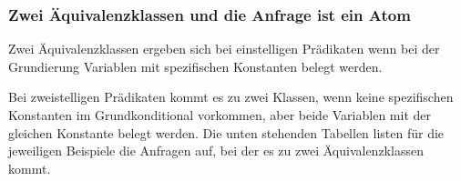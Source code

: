 \documentclass[a4paper, 11pt]{book}
\begin{document}
\subsubsection {Zwei Äquivalenzklassen und die Anfrage ist ein Atom} \label{Atom_zweiKlassen}

	Zwei Äquivalenzklassen ergeben sich bei einstelligen Prädikaten wenn bei der Grundierung Variablen mit spezifischen Konstanten belegt werden. 
	
	Bei zweistelligen Prädikaten kommt es zu zwei Klassen, wenn keine spezifischen Konstanten im Grundkonditional vorkommen, aber beide Variablen mit der gleichen Konstante belegt werden.
	Die unten stehenden Tabellen listen für die jeweiligen Beispiele die Anfragen auf, bei der es zu zwei Äquivalenzklassen kommt.




\fontsize{11pt}{13.2pt}\selectfont

\setlongtables
\end{document}
